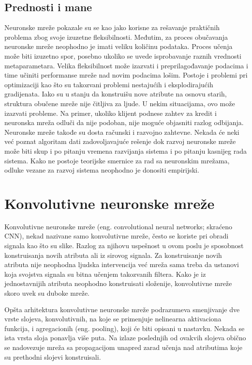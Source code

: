 \subsection{Prednosti i mane}

Neuronske mreže pokazale su se kao jako korisne za rešavanje praktičnih problema zbog svoje izuzetne fleksibilnosti. Međutim, za proces obučavanja neuronske mreže neophodno je imati veliku količinu podataka. Proces učenja može biti izuzetno spor, posebno ukoliko se uvede isprobavanje raznih vrednosti metaparametara. Velika fleksibilnost može izazvati i preprilagođavanje podacima i time učiniti performanse mreže nad novim podacima lošim. Postoje i problemi pri optimizaciji kao što su takozvani problemi nestajućih i eksplodirajućih gradijenata. Iako su u stanju da konstruišu nove atribute na osnovu starih, struktura obučene mreže nije čitljiva za ljude. U nekim situacijama, ovo može izazvati probleme. Na primer, ukoliko klijent podnese zahtev za kredit i neuronska mreža odluči da nije podoban, nije moguće objasniti razlog odbijanja. Neuronske mreže takođe su dosta računski i razvojno zahtevne. Nekada će neki već poznat algoritam dati zadovoljavajuće rešenje dok razvoj neuronske mreže može biti skup i po pitanju vremena razvijanja sistema i po pitanju kasnijeg rada sistema. 
Kako ne postoje teorijske smernice za rad sa neuronskim mrežama, odluke vezane za razvoj sistema neophodno je donositi empirijski.

\section{Konvolutivne neuronske mreže}
\label{sec:cnn}

Konvolutivne neuronske mreže (eng. convolutional neural networks; skraćeno CNN), nekad nazivane samo konvolutivne mreže, često se koriste pri obradi signala kao što su slike. Razlog za njihovu uspešnost u ovom poslu je sposobnost konstruisanja novih atributa ali iz sirovog signala. Za konstruisanje novih atributa nije neophodna ljudska intervencija već mreža sama treba da ustanovi koja svojstva signala su bitna učenjem takozvanih filtera. Kako je iz jednostavnijih atributa neophodno konstruisati složenije, konvolutivne mreže skoro uvek su duboke mreže.
\par 
Opšta arhitektura konvolutivne neuronske mreže podrazumeva smenjivanje dve vrste slojeva, konvolutivnih, na koje se primenjuje nelinearna aktivaciona funkcija, i agregacionih (eng. pooling), koji će biti opisani u nastavku. Nekada se ista vrsta sloja ponavlja više puta. Na izlaze poslednjih od ovakvih slojeva obično se nadovezuje mreža sa propagacijom unapred zarad učenja nad atributima koje su prethodni slojevi konstruisali. 


